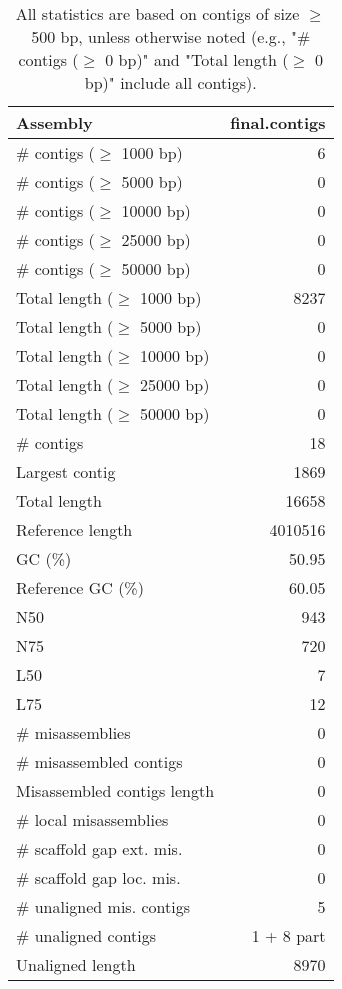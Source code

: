 \documentclass[12pt,a4paper]{article}
\begin{document}
\begin{table}[ht]
\begin{center}
\caption{All statistics are based on contigs of size $\geq$ 500 bp, unless otherwise noted (e.g., "\# contigs ($\geq$ 0 bp)" and "Total length ($\geq$ 0 bp)" include all contigs).}
\begin{tabular}{|l*{1}{|r}|}
\hline
Assembly & final.contigs \\ \hline
\# contigs ($\geq$ 1000 bp) & 6 \\ \hline
\# contigs ($\geq$ 5000 bp) & 0 \\ \hline
\# contigs ($\geq$ 10000 bp) & 0 \\ \hline
\# contigs ($\geq$ 25000 bp) & 0 \\ \hline
\# contigs ($\geq$ 50000 bp) & 0 \\ \hline
Total length ($\geq$ 1000 bp) & 8237 \\ \hline
Total length ($\geq$ 5000 bp) & 0 \\ \hline
Total length ($\geq$ 10000 bp) & 0 \\ \hline
Total length ($\geq$ 25000 bp) & 0 \\ \hline
Total length ($\geq$ 50000 bp) & 0 \\ \hline
\# contigs & 18 \\ \hline
Largest contig & 1869 \\ \hline
Total length & 16658 \\ \hline
Reference length & 4010516 \\ \hline
GC (\%) & 50.95 \\ \hline
Reference GC (\%) & 60.05 \\ \hline
N50 & 943 \\ \hline
N75 & 720 \\ \hline
L50 & 7 \\ \hline
L75 & 12 \\ \hline
\# misassemblies & 0 \\ \hline
\# misassembled contigs & 0 \\ \hline
Misassembled contigs length & 0 \\ \hline
\# local misassemblies & 0 \\ \hline
\# scaffold gap ext. mis. & 0 \\ \hline
\# scaffold gap loc. mis. & 0 \\ \hline
\# unaligned mis. contigs & 5 \\ \hline
\# unaligned contigs & 1 + 8 part \\ \hline
Unaligned length & 8970 \\ \hline

\end{tabular}
\end{center}
\end{table}
\end{document}
